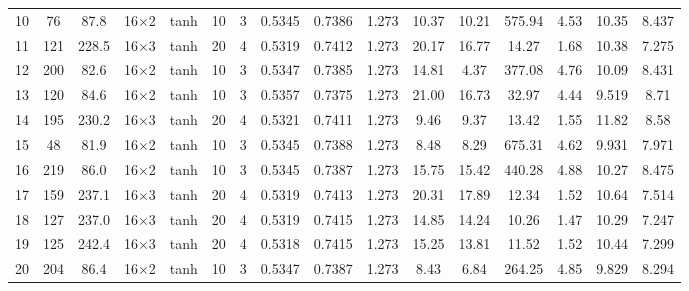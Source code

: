 \begin{tabular}{lcc cccc ccccccc cc}
  10 & 76 & 87.8 & 16$\times$2 & tanh & 10 & 3 & \num{0.5345} & \num{0.7386} & \num{1.273} & 10.37 & 10.21 & 575.94 & 4.53 & \num{10.35} & \num{8.437} \\
  11 & 121 & 228.5 & 16$\times$3 & tanh & 20 & 4 & \num{0.5319} & \num{0.7412} & \num{1.273} & 20.17 & 16.77 & 14.27 & 1.68 & \num{10.38} & \num{7.275} \\
  12 & 200 & 82.6 & 16$\times$2 & tanh & 10 & 3 & \num{0.5347} & \num{0.7385} & \num{1.273} & 14.81 & 4.37 & 377.08 & 4.76 & \num{10.09} & \num{8.431} \\
  13 & 120 & 84.6 & 16$\times$2 & tanh & 10 & 3 & \num{0.5357} & \num{0.7375} & \num{1.273} & 21.00 & 16.73 & 32.97 & 4.44 & \num{9.519} & \num{8.71} \\
  14 & 195 & 230.2 & 16$\times$3 & tanh & 20 & 4 & \num{0.5321} & \num{0.7411} & \num{1.273} & 9.46 & 9.37 & 13.42 & 1.55 & \num{11.82} & \num{8.58} \\
  15 & 48 & 81.9 & 16$\times$2 & tanh & 10 & 3 & \num{0.5345} & \num{0.7388} & \num{1.273} & 8.48 & 8.29 & 675.31 & 4.62 & \num{9.931} & \num{7.971} \\
  16 & 219 & 86.0 & 16$\times$2 & tanh & 10 & 3 & \num{0.5345} & \num{0.7387} & \num{1.273} & 15.75 & 15.42 & 440.28 & 4.88 & \num{10.27} & \num{8.475} \\
  17 & 159 & 237.1 & 16$\times$3 & tanh & 20 & 4 & \num{0.5319} & \num{0.7413} & \num{1.273} & 20.31 & 17.89 & 12.34 & 1.52 & \num{10.64} & \num{7.514} \\
  18 & 127 & 237.0 & 16$\times$3 & tanh & 20 & 4 & \num{0.5319} & \num{0.7415} & \num{1.273} & 14.85 & 14.24 & 10.26 & 1.47 & \num{10.29} & \num{7.247} \\
  19 & 125 & 242.4 & 16$\times$3 & tanh & 20 & 4 & \num{0.5318} & \num{0.7415} & \num{1.273} & 15.25 & 13.81 & 11.52 & 1.52 & \num{10.44} & \num{7.299} \\
  20 & 204 & 86.4 & 16$\times$2 & tanh & 10 & 3 & \num{0.5347} & \num{0.7387} & \num{1.273} & 8.43 & 6.84 & 264.25 & 4.85 & \num{9.829} & \num{8.294} \\
\bottomrule
\end{tabular}
